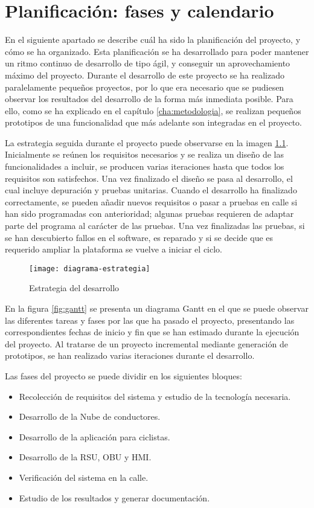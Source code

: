 \chapter{Planificación: fases y calendario}
En el siguiente apartado se describe cuál ha sido la planificación del proyecto, y cómo se ha organizado.
Esta planificación se ha desarrollado para poder mantener un ritmo continuo de desarrollo de tipo ágil,
y conseguir un aprovechamiento máximo del proyecto. Durante el desarrollo de este proyecto se ha realizado
paralelamente pequeños proyectos, por lo que era necesario que se pudiesen observar los resultados del
desarrollo de la forma más inmediata posible. Para ello, como se ha explicado en el capítulo
\ref{cha:metodologia}, se realizan pequeños prototipos de una funcionalidad que más adelante son integradas
en el proyecto.

La estrategia seguida durante el proyecto puede observarse en la imagen \ref{fig:estrategia}. Inicialmente se
reúnen los requisitos necesarios y se realiza un diseño de las funcionalidades a incluir, se producen varias
iteraciones hasta que todos los requisitos son satisfechos. Una vez finalizado el diseño se pasa al desarrollo,
el cual incluye depuración y pruebas unitarias. Cuando el desarrollo ha finalizado correctamente, se pueden
añadir nuevos requisitos o pasar a pruebas en calle si han sido programadas con anterioridad; algunas pruebas
requieren de adaptar parte del programa al carácter de las pruebas. Una vez finalizadas las pruebas, si se han
descubierto fallos en el software, es reparado y si se decide que es requerido ampliar la plataforma se vuelve
a iniciar el ciclo.
\begin{figure}[H]
	\begin{center}
		\texttt{[image: diagrama-estrategia]}
		\caption{Estrategia del desarrollo}
		\label{fig:estrategia}
	\end{center}
\end{figure}

En la figura \ref{fig:gantt} se presenta un diagrama Gantt en el que se puede observar las diferentes tareas y
fases por las que ha pasado el proyecto, presentando las correspondientes fechas de inicio y fin que se han
estimado durante la ejecución del proyecto. Al tratarse de un proyecto incremental mediante generación de
prototipos, se han realizado varias iteraciones durante el desarrollo.

Las fases del proyecto se puede dividir en los siguientes bloques:
\begin{itemize}
	\item Recolección de requisitos del sistema y estudio de la tecnología necesaria.
	\item Desarrollo de la Nube de conductores.
	\item Desarrollo de la aplicación para ciclistas.
	\item Desarrollo de la RSU, OBU y HMI.
	\item Verificación del sistema en la calle.
	\item Estudio de los resultados y generar documentación.
\end{itemize}

